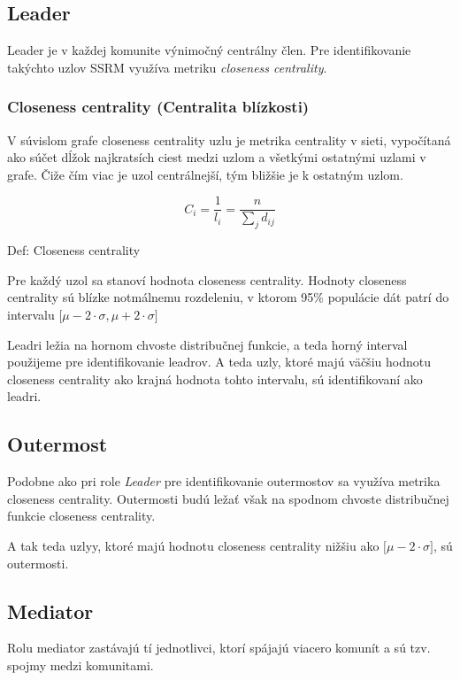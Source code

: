 \documentclass[slovak,master,public,dept460,male,cpdeclaration,oneside]{diploma}
\begin{document}
\subsection{Leader}
Leader je v každej komunite výnimočný centrálny člen. Pre identifikovanie takýchto uzlov SSRM využíva metriku \textit{closeness centrality}.

\subsubsection{Closeness centrality (Centralita blízkosti)}
V súvislom grafe closeness centrality uzlu je metrika centrality v sieti, vypočítaná ako súčet dĺžok najkratsích ciest medzi uzlom a všetkými ostatnými uzlami v grafe. Čiže čím viac je uzol centrálnejší, tým bližšie je k ostatným uzlom.


\begin{mycapequ}[!ht]
      \begin{equation*}
     C_{i} = \frac{1}{l_{i}}=\frac{n}{\sum_{j}d_{ij}}
   \end{equation*}
   \caption{Def: Closeness centrality}
\end{mycapequ}


\begin{sloppypar}
Pre každý uzol sa stanoví hodnota closeness centrality. Hodnoty closeness centrality sú blízke notmálnemu rozdeleniu, v ktorom 95\% populácie dát patrí do intervalu ${\big[ \mu - 2\cdot\sigma, \mu + 2\cdot\sigma \big]}$
\end{sloppypar}

Leadri ležia na hornom chvoste distribučnej funkcie, a teda horný interval použijeme pre identifikovanie leadrov. A teda uzly, ktoré majú väčšiu hodnotu closeness centrality ako krajná hodnota tohto intervalu, sú identifikovaní ako leadri.

\subsection{Outermost}
Podobne ako pri role \textit{Leader} pre identifikovanie outermostov sa využíva metrika closeness centrality. Outermosti budú ležať však na spodnom chvoste distribučnej funkcie closeness centrality.

A tak teda uzlyy, ktoré majú hodnotu closeness centrality nižšiu ako ${\big[ \mu - 2\cdot\sigma \big]}$, sú outermosti.

\subsection{Mediator}
Rolu mediator zastávajú tí jednotlivci, ktorí spájajú viacero komunít a sú tzv. spojmy medzi komunitami. 
\end{document}
